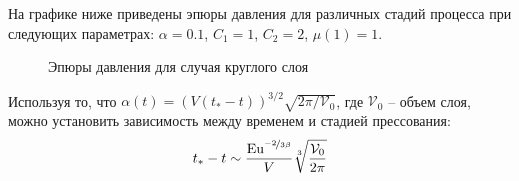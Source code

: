 На графике ниже приведены эпюры давления для различных стадий процесса при следующих параметрах: $\alpha=0.1$, $C_1=1$, $C_2=2$, $\mu(1)=1$.
\begin{figure}[ht]
  \caption{Эпюры давления для случая круглого слоя}
  \label{fig:ch1/pressure}
\end{figure}

Используя то, что $\alpha(t) = \left(V \left(t_*-t\right)\right)^{3/2} \sqrt{2\pi / \mathcal{V}_0}$, где $\mathcal{V}_0$ -- объем слоя, можно установить зависимость между временем и стадией прессования:
\begin{equation}
  t_* - t \sim \frac{\text{Eu}^{\nicefrac{-2}{3\beta}}}{V}\sqrt[3]{\frac{\mathcal{V}_0}{2\pi}}
\end{equation}
